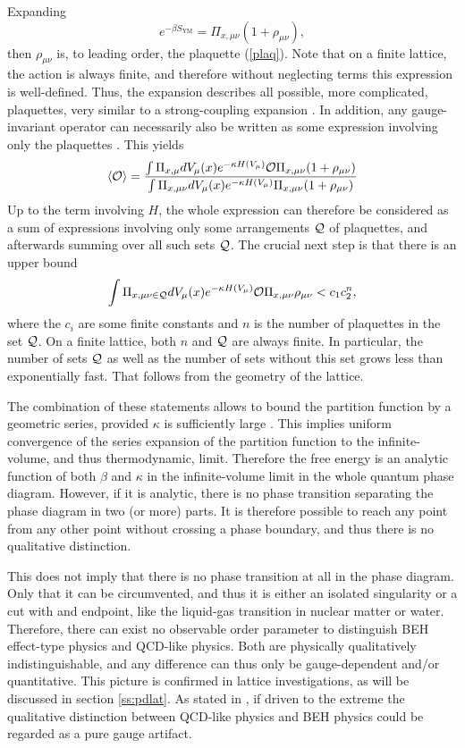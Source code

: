 \documentclass[final,12pt,3p,longtitle]{elsarticle}
\newcommand*{\no}{\noindent}
\newcommand*{\be}{\begin{equation}}
\newcommand*{\ee}{\end{equation}}
\newcommand*{\pref}[1]{(\ref{#1})}
\newcommand*{\mn}{{\mu\nu}}
\newcommand*{\nn}{\nonumber}
\newcommand*{\1}{1\!\!\!\bot}
\newcommand*{\la}{\left\langle}
\newcommand*{\ra}{\right\rangle}
\newcommand*{\op}{{\cal O}}
\newcommand*{\ym}{{\text{YM}}}
\begin{document}
Expanding
\be
e^{-\beta S_\ym}=\Pi_{x,\mn}(1+\rho_\mn)\nn,
\ee
\no then $\rho_\mn$ is, to leading order, the plaquette \pref{plaq}. Note that on a finite lattice, the action is always finite, and therefore without neglecting terms this expression is well-defined. Thus, the expansion describes all possible, more complicated, plaquettes, very similar to a strong-coupling expansion \cite{Montvay:1994cy}. In addition, any gauge-invariant operator can necessarily also be written as some expression involving only the plaquettes \cite{Montvay:1994cy}. This yields \cite{Osterwalder:1977pc}
\be
\la\op\ra=\frac{\int\Pi_{x,\mu}dV_\mu(x)e^{-\kappa H(V_\mu)}\op \Pi_{x,\mn}(1+\rho_\mn)}{\int\Pi_{x,\mn}dV_\mu(x) e^{-\kappa H(V_\mu)}\Pi_{x,\mn}(1+\rho_\mn)}\nn
\ee
\no Up to the term involving $H$, the whole expression can therefore be considered as a sum of expressions involving only some arrangements ${\cal Q}$ of plaquettes, and afterwards summing over all such sets ${\cal Q}$. The crucial next step is that there is an upper bound \cite{Osterwalder:1977pc}
\be
\int\Pi_{{x,\mn}\in{\cal Q}}dV_\mu(x)e^{-\kappa H(V_\mu)}\op \Pi_{x,\mn}\rho_\mn< c_1c_2^n\nn,
\ee
\no where the $c_i$ are some finite constants and $n$ is the number of plaquettes in the set ${\cal Q}$. On a finite lattice, both $n$ and ${\cal Q}$ are always finite. In particular, the number of sets ${\cal Q}$ as well as the number of sets without this set grows less than exponentially fast. That follows from the geometry of the lattice.

The combination of these statements allows to bound the partition function by a geometric series, provided $\kappa$ is sufficiently large \cite{Osterwalder:1977pc,Fradkin:1978dv}. This implies uniform convergence of the series expansion of the partition function to the infinite-volume, and thus thermodynamic, limit. Therefore the free energy is an analytic function of both $\beta$ and $\kappa$ in the infinite-volume limit in the whole quantum phase diagram. However, if it is analytic, there is no phase transition separating the phase diagram in two (or more) parts. It is therefore possible to reach any point from any other point without crossing a phase boundary, and thus there is no qualitative distinction.

This does not imply that there is no phase transition at all in the phase diagram. Only that it can be circumvented, and thus it is either an isolated singularity or a cut with and endpoint, like the liquid-gas transition in nuclear matter or water. Therefore, there can exist no observable order parameter to distinguish BEH effect-type physics and QCD-like physics. Both are physically qualitatively indistinguishable, and any difference can thus only be gauge-dependent and/or quantitative. This picture is confirmed in lattice investigations, as will be discussed in section \ref{ss:pdlat}. As stated in \cite{Seiler:2015rwa}, if driven to the extreme the qualitative distinction between QCD-like physics and BEH physics could be regarded as a pure gauge artifact.
\end{document}
